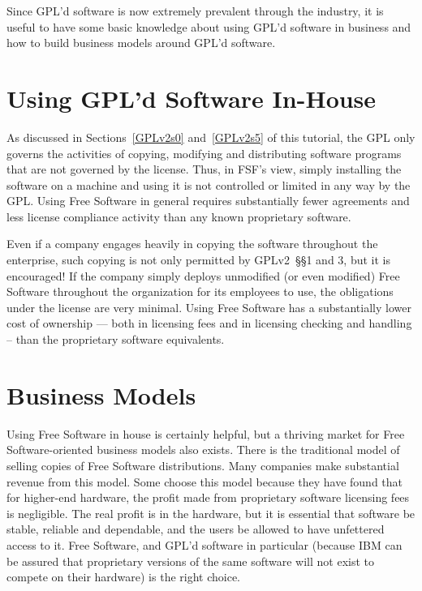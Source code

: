 Since GPL'd software is now extremely prevalent through the industry, it
is useful to have some basic knowledge about using GPL'd software in
business and how to build business models around GPL'd software.

\section{Using GPL'd Software In-House}

As discussed in Sections~\ref{GPLv2s0} and~\ref{GPLv2s5} of this tutorial,
the GPL only governs the activities of copying, modifying and
distributing software programs that are not governed by the license.
Thus, in FSF's view, simply installing the software on a machine and
using it is not controlled or limited in any way by the GPL\@. Using Free
Software in general requires substantially fewer agreements and less
license compliance activity than any known proprietary software.

Even if a company engages heavily in copying the software throughout the
enterprise, such copying is not only permitted by GPLv2~\S\S1 and 3, but it is
encouraged!  If the company simply deploys unmodified (or even modified)
Free Software throughout the organization for its employees to use, the
obligations under the license are very minimal. Using Free Software has a
substantially lower cost of ownership --- both in licensing fees and in
licensing checking and handling -- than the proprietary software
equivalents.

\section{Business Models}
\label{Business Models}

Using Free Software in house is certainly helpful, but a thriving
market for Free Software-oriented business models also exists. There is the
traditional model of selling copies of Free Software distributions.
Many companies make substantial revenue
from this model. Some choose this model because they have
found that for higher-end hardware, the profit made from proprietary
software licensing fees is negligible. The real profit is in the hardware,
but it is essential that software be stable, reliable and dependable, and
the users be allowed to have unfettered access to it. Free Software, and
GPL'd software in particular (because IBM can be assured that proprietary
versions of the same software will not exist to compete on their hardware)
is the right choice.

